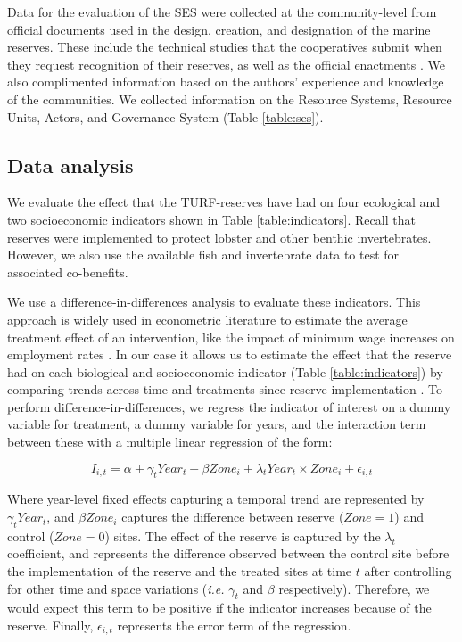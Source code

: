 \documentclass{frontiersSCNS}
\begin{document}
Data for the evaluation of the SES were collected at the community-level from official documents used in the design, creation, and designation of the marine reserves. These include the technical studies that the cooperatives submit when they request recognition of their reserves, as well as the official enactments \citep{dof_website_2012,dof_website_2013,dof_website_2018}. We also complimented information based on the authors' experience and knowledge of the communities. We collected information on the Resource Systems, Resource Units, Actors, and Governance System (Table \ref{table:ses}).

\hypertarget{data-analysis}{%
\subsection{Data analysis}\label{data-analysis}}

We evaluate the effect that the TURF-reserves have had on four ecological and two socioeconomic indicators shown in Table \ref{table:indicators}. Recall that reserves were implemented to protect lobster and other benthic invertebrates. However, we also use the available fish and invertebrate data to test for associated co-benefits.

We use a difference-in-differences analysis to evaluate these indicators. This approach is widely used in econometric literature to estimate the average treatment effect of an intervention, like the impact of minimum wage increases on employment rates \citep{card_1994}. In our case it allows us to estimate the effect that the reserve had on each biological and socioeconomic indicator (Table \ref{table:indicators}) by comparing trends across time and treatments since reserve implementation \citep{moland_2013,Villasenor-Derbez_2018}. To perform difference-in-differences, we regress the indicator of interest on a dummy variable for treatment, a dummy variable for years, and the interaction term between these with a multiple linear regression of the form:

\begin{equation}
I_{i,t} = \alpha + \gamma_{t} Year_t + \beta Zone_i + \lambda_{t} Year_t\times Zone_i + \epsilon_{i,t}
\label{eqn:reg_bio}
\end{equation}

Where year-level fixed effects capturing a temporal trend are represented by \(\gamma_t Year_t\), and \(\beta Zone_i\) captures the difference between reserve (\(Zone = 1\)) and control (\(Zone = 0\)) sites. The effect of the reserve is captured by the \(\lambda_t\) coefficient, and represents the difference observed between the control site before the implementation of the reserve and the treated sites at time \(t\) after controlling for other time and space variations (\emph{i.e.} \(\gamma_t\) and \(\beta\) respectively). Therefore, we would expect this term to be positive if the indicator increases because of the reserve. Finally, \(\epsilon_{i,t}\) represents the error term of the regression.
\end{document}
